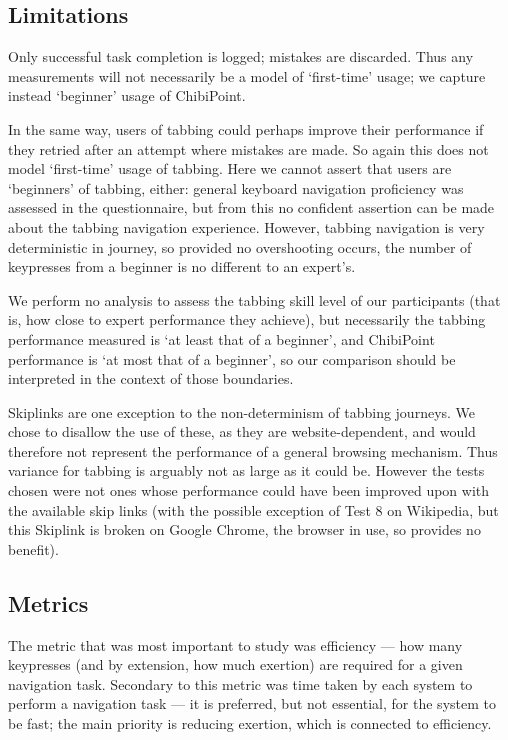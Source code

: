 \documentclass[a4paper, 12pt]{report}
\begin{document}
\subsection{Limitations}
Only successful task completion is logged; mistakes are discarded. Thus any measurements will not necessarily be a model of `first-time' usage; we capture instead `beginner' usage of ChibiPoint.

In the same way, users of tabbing could perhaps improve their performance if they retried after an attempt where mistakes are made. So again this does not model `first-time' usage of tabbing. Here we cannot assert that users are `beginners' of tabbing, either: general keyboard navigation proficiency was assessed in the questionnaire, but from this no confident assertion can be made about the tabbing navigation experience. However, tabbing navigation is very deterministic in journey, so provided no overshooting occurs, the number of keypresses from a beginner is no different to an expert's.

We perform no analysis to assess the tabbing skill level of our participants (that is, how close to expert performance they achieve), but necessarily the tabbing performance measured is `at least that of a beginner', and ChibiPoint performance is `at most that of a beginner', so our comparison should be interpreted in the context of those boundaries.

Skiplinks are one exception to the non-determinism of tabbing journeys. We chose to disallow the use of these, as they are website-dependent, and would therefore not represent the performance of a general browsing mechanism. Thus variance for tabbing is arguably not as large as it could be. However the tests chosen were not ones whose performance could have been improved upon with the available skip links (with the possible exception of Test 8 on Wikipedia, but this Skiplink is broken on Google Chrome, the browser in use, so provides no benefit).

\subsection{Metrics}
The metric that was most important to study was efficiency --- how many keypresses (and by extension, how much exertion) are required for a given navigation task. Secondary to this metric was time taken by each system to perform a navigation task --- it is preferred, but not essential, for the system to be fast; the main priority is reducing exertion, which is connected to efficiency.
\end{document}
